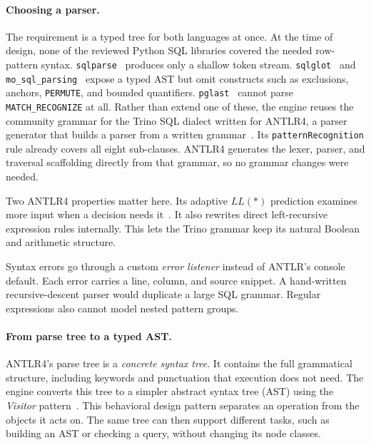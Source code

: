 \paragraph{Choosing a parser.}
The requirement is a typed tree for both languages at once.  At the
time of design, none of the reviewed Python SQL libraries covered the
needed row-pattern syntax.
\texttt{sqlparse}~\cite{sqlparse_tool}
produces only a shallow token stream.
\texttt{sqlglot}~\cite{sqlglot_tool} and
\texttt{mo\_sql\_parsing}~\cite{mo_sql_parsing_tool} expose a typed AST
but omit constructs such as exclusions, anchors, \texttt{PERMUTE}, and
bounded quantifiers.  \texttt{pglast}~\cite{pglast_tool} cannot
parse \texttt{MATCH\_RECOGNIZE} at all.  Rather than extend one of
these, the engine reuses the community grammar for the Trino SQL
dialect written for ANTLR4, a parser generator that builds a parser
from a written grammar~\cite{antlr_trino_sql,Parr2013}.  Its
\texttt{patternRecognition} rule already covers all eight
sub-clauses.  ANTLR4 generates the lexer, parser, and traversal
scaffolding directly from that grammar, so no grammar changes were
needed.

Two ANTLR4 properties matter here.  Its adaptive $LL(*)$ prediction
examines more input when a decision needs it~\cite{parr2014adaptive}.
It also rewrites direct left-recursive expression rules internally.
This lets the Trino grammar keep its natural Boolean and arithmetic
structure.

Syntax errors go through a custom \emph{error listener} instead of
ANTLR's console default.  Each error carries a line, column, and source
snippet.  A hand-written recursive-descent parser would duplicate a
large SQL grammar.  Regular expressions also cannot model nested
pattern groups.

\paragraph{From parse tree to a typed AST.}
ANTLR4's parse tree is a \emph{concrete syntax tree}.  It contains the
full grammatical structure, including keywords and punctuation that
execution does not need.  The engine converts this tree to a simpler
abstract syntax tree (AST) using the \emph{Visitor}
pattern~\cite{robson2022designpatterns,Parr2013}.  This behavioral
design pattern separates an operation from the objects it acts on.
The same tree can then support different tasks, such as building an
AST or checking a query, without changing its node classes.

